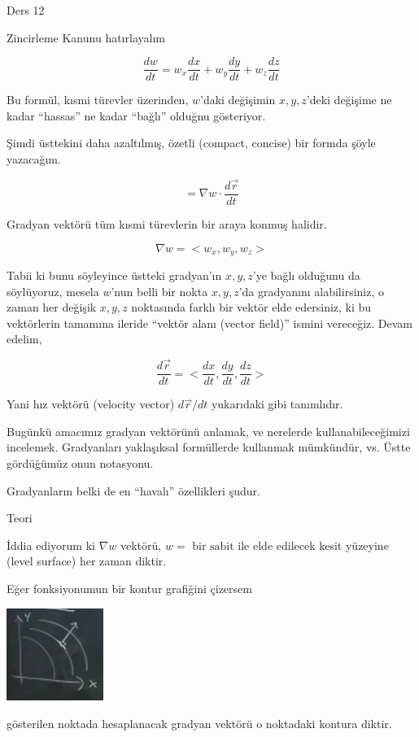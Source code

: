 \documentclass[12pt,fleqn]{article}\usepackage{../../common}
\begin{document}
Ders 12

Zincirleme Kanunu hatırlayalım

$$ \frac{dw}{dt}  = w_x \frac{dx}{dt} + 
w_y \frac{dy}{dt} + 
w_z \frac{dz}{dt}  $$

Bu formül, kısmi türevler üzerinden, $w$'daki değişimin $x,y,z$'deki
değişime ne kadar ``hassas'' ne kadar ``bağlı'' olduğnu gösteriyor.

Şimdi üsttekini daha azaltılmış, özetli (compact, concise) bir formda şöyle
yazacağım. 

$$ 
= \nabla w \cdot  \frac{d\vec{r}}{dt} 
$$

Gradyan vektörü tüm kısmi türevlerin bir araya konmuş halidir. 

$$ \nabla w = < w_x, w_y, w_z > $$

Tabii ki bunu söyleyince üstteki gradyan'ın $x,y,z$'ye bağlı olduğunu da
söylüyoruz, mesela $w$'nun belli bir nokta $x,y,z$'da gradyanını
alabilirsiniz, o zaman her değişik $x,y,z$ noktasında farklı bir vektör
elde edersiniz, ki bu vektörlerin tamamına ileride ``vektör alanı (vector
field)'' ismini vereceğiz. Devam edelim, 

$$ \frac{d\vec{r}}{dt} = < \frac{dx}{dt}, \frac{dy}{dt}, \frac{dz}{dt} > $$

Yani hız vektörü (velocity vector) $d\vec{r}/{dt}$ yukarıdaki gibi
tanımlıdır.

Bugünkü amacımız gradyan vektörünü anlamak, ve nerelerde
kullanabileceğimizi incelemek. Gradyanları yaklaşıksal formüllerde
kullanmak mümkündür, vs. Üstte gördüğümüz onun notasyonu. 

Gradyanların belki de en ``havalı'' özellikleri şudur. 

Teori

İddia ediyorum ki $\nabla w$ vektörü, $w = \textrm{ bir sabit }$ile elde
edilecek kesit yüzeyine (level surface) her zaman diktir.

Eğer fonksiyonumun bir kontur grafiğini çizersem
\begin{center}
\includegraphics[height=3cm]{12_1.png}
\end{center}
gösterilen noktada hesaplanacak gradyan vektörü o noktadaki kontura
diktir. 
\end{document}
